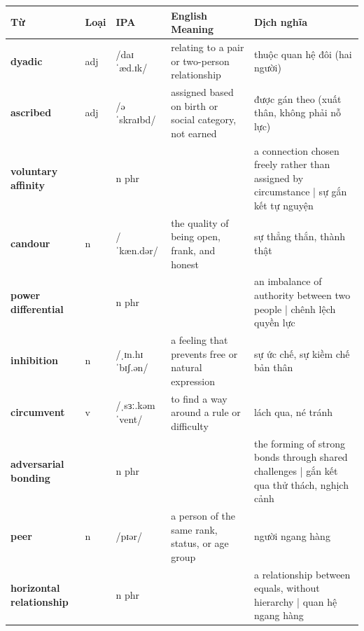 \vspace{0.8em}
\begin{center}
\renewcommand{\arraystretch}{1.65}
\begin{tabularx}{\textwidth}{|V{0.22\textwidth}|C{0.07\textwidth}|I{0.20\textwidth}|Y|V{0.18\textwidth}|}
\hline
{}
\textbf{Từ} & \textbf{Loại} & \textbf{IPA} & \textbf{English Meaning} & \textbf{Dịch nghĩa} \\
\hline
\textbf{dyadic} & adj & /daɪˈæd.ɪk/ & relating to a pair or two-person relationship & thuộc quan hệ đôi (hai người) \\ \hline
\textbf{ascribed} & adj & /əˈskraɪbd/ & assigned based on birth or social category, not earned & được gán theo (xuất thân, không phải nỗ lực) \\ \hline
\textbf{voluntary affinity} & & n phr & & a connection chosen freely rather than assigned by circumstance | sự gắn kết tự nguyện \\ \hline
\textbf{candour} & n & /ˈkæn.dər/ & the quality of being open, frank, and honest & sự thẳng thắn, thành thật \\ \hline
\textbf{power differential} & & n phr & & an imbalance of authority between two people | chênh lệch quyền lực \\ \hline
\textbf{inhibition} & n & /ˌɪn.hɪˈbɪʃ.ən/ & a feeling that prevents free or natural expression & sự ức chế, sự kiềm chế bản thân \\ \hline
\textbf{circumvent} & v & /ˌsɜː.kəmˈvent/ & to find a way around a rule or difficulty & lách qua, né tránh \\ \hline
\textbf{adversarial bonding} & & n phr & & the forming of strong bonds through shared challenges | gắn kết qua thử thách, nghịch cảnh \\ \hline
\textbf{peer} & n & /pɪər/ & a person of the same rank, status, or age group & người ngang hàng \\ \hline
\textbf{horizontal relationship} & & n phr & & a relationship between equals, without hierarchy | quan hệ ngang hàng \\ \hline
\end{tabularx}
\end{center}

\newpage

